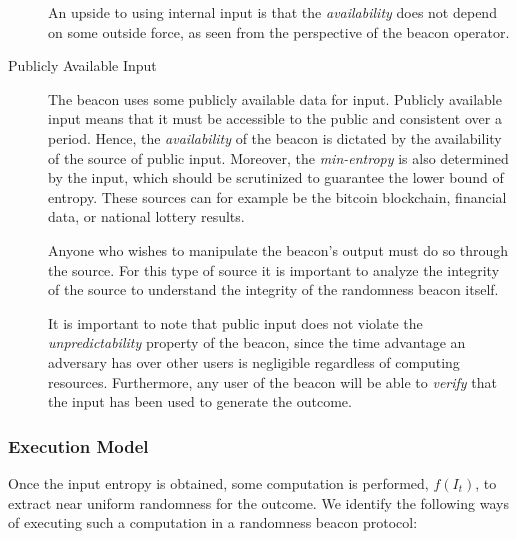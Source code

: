 \begin{description}
        An upside to using internal input is that the \emph{availability} does not depend on some outside force, as seen from the perspective of the beacon operator.

    \item[Publicly Available Input]
        The beacon uses some publicly available data for input.
        Publicly available input means that it must be accessible to the public and consistent over a period.
        Hence, the \emph{availability} of the beacon is dictated by the availability of the source of public input.
        Moreover, the \emph{min-entropy} is also determined by the input, which should be scrutinized to guarantee the lower bound of entropy.
        These sources can for example be the bitcoin blockchain, financial data, or national lottery results.

        Anyone who wishes to manipulate the beacon's output must do so through the source.
        For this type of source it is important to analyze the integrity of the source to understand the integrity of the randomness beacon itself.

        It is important to note that public input does not violate the \emph{unpredictability} property of the beacon, since the time advantage an adversary has over other users is negligible regardless of computing resources.
        Furthermore, any user of the beacon will be able to \emph{verify} that the input has been used to generate the outcome.

\end{description}

\subsubsection{Execution Model}
Once the input entropy is obtained, some computation is performed, $f(I_t)$, to extract near uniform randomness for the outcome.
We identify the following ways of executing such a computation in a randomness beacon protocol:

